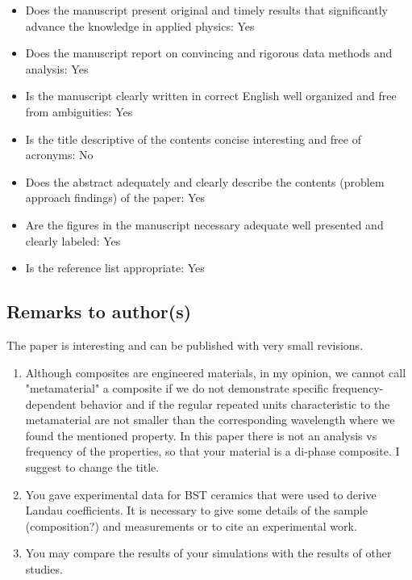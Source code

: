 \documentclass[%
 aip,
 amsmath,amssymb,
 reprint,%
]{revtex4-1}
\begin{document}
\begin{itemize}
  \item Does the manuscript present original and timely results that significantly advance the knowledge in
   applied physics: Yes
  \item Does the manuscript report on convincing and rigorous data methods and analysis: Yes
  \item Is the manuscript clearly written in correct English well organized and free from ambiguities: Yes
  \item Is the title descriptive of the contents concise interesting and free of acronyms: No
  \item Does the abstract adequately and clearly describe the contents (problem approach findings) of the
   paper: Yes
  \item Are the figures in the manuscript necessary adequate well presented and clearly labeled: Yes
  \item Is the reference list appropriate: Yes
\end{itemize}



\subsection{Remarks to author(s)}

  The paper is interesting and can be published with very small revisions.

  \begin{enumerate}
  \item Although composites are engineered materials, in my opinion, we cannot call "metamaterial" a
   composite if we do not demonstrate specific frequency-dependent behavior and if the regular repeated
    units characteristic to the metamaterial are not smaller than the corresponding wavelength where we
     found the mentioned property. In this paper there is not an analysis vs frequency of the properties,
      so that your material is a di-phase composite. I suggest to change the title.
  \item You gave experimental data for BST ceramics that were used to derive Landau coefficients. It is
   necessary to give some details of the sample (composition?) and measurements or to cite an experimental
    work.
  \item You may compare the results of your simulations with the results of other studies.


\end{enumerate}
\end{document}
